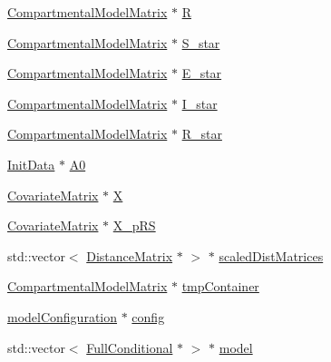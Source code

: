 \begin{DoxyCompactItemize}
\item 
\hyperlink{classSpatialSEIR_1_1CompartmentalModelMatrix}{Compartmental\-Model\-Matrix} $\ast$ \hyperlink{classSpatialSEIR_1_1ModelContext_a97ad90554c0f23cc4137661285df3213}{R}
\item 
\hyperlink{classSpatialSEIR_1_1CompartmentalModelMatrix}{Compartmental\-Model\-Matrix} $\ast$ \hyperlink{classSpatialSEIR_1_1ModelContext_a6fce6827d821ab06e57abe08e6f6c4cb}{S\-\_\-star}
\item 
\hyperlink{classSpatialSEIR_1_1CompartmentalModelMatrix}{Compartmental\-Model\-Matrix} $\ast$ \hyperlink{classSpatialSEIR_1_1ModelContext_a92a044fd49fd0d4996dd38a38f3f14a9}{E\-\_\-star}
\item 
\hyperlink{classSpatialSEIR_1_1CompartmentalModelMatrix}{Compartmental\-Model\-Matrix} $\ast$ \hyperlink{classSpatialSEIR_1_1ModelContext_adf47583e6bd65b272ea17dc84620e09f}{I\-\_\-star}
\item 
\hyperlink{classSpatialSEIR_1_1CompartmentalModelMatrix}{Compartmental\-Model\-Matrix} $\ast$ \hyperlink{classSpatialSEIR_1_1ModelContext_a03a86c851b58cf707ed0e0f734f01780}{R\-\_\-star}
\item 
\hyperlink{classSpatialSEIR_1_1InitData}{Init\-Data} $\ast$ \hyperlink{classSpatialSEIR_1_1ModelContext_abe200f29b14eee50f6626d6280596785}{A0}
\item 
\hyperlink{classSpatialSEIR_1_1CovariateMatrix}{Covariate\-Matrix} $\ast$ \hyperlink{classSpatialSEIR_1_1ModelContext_ab92eeb3b5c0ee046321578f1b7fccea3}{X}
\item 
\hyperlink{classSpatialSEIR_1_1CovariateMatrix}{Covariate\-Matrix} $\ast$ \hyperlink{classSpatialSEIR_1_1ModelContext_ab4a6806ee81ecdd67ef14f40694a066c}{X\-\_\-p\-R\-S}
\item 
std\-::vector$<$ \hyperlink{classSpatialSEIR_1_1DistanceMatrix}{Distance\-Matrix} $\ast$ $>$ $\ast$ \hyperlink{classSpatialSEIR_1_1ModelContext_a7e263c5ae20ecdc892053a2588903459}{scaled\-Dist\-Matrices}
\item 
\hyperlink{classSpatialSEIR_1_1CompartmentalModelMatrix}{Compartmental\-Model\-Matrix} $\ast$ \hyperlink{classSpatialSEIR_1_1ModelContext_ae4569072f48495d446ef85968cb9a42d}{tmp\-Container}
\item 
\hyperlink{structSpatialSEIR_1_1modelConfiguration}{model\-Configuration} $\ast$ \hyperlink{classSpatialSEIR_1_1ModelContext_a7c8c2708dabbc0a32bf32252942b3a12}{config}
\item 
std\-::vector$<$ \hyperlink{classSpatialSEIR_1_1FullConditional}{Full\-Conditional} $\ast$ $>$ $\ast$ \hyperlink{classSpatialSEIR_1_1ModelContext_ad8f3a8fd85bef0ce628c0ea0a5debc8b}{model}

\end{DoxyCompactItemize}
